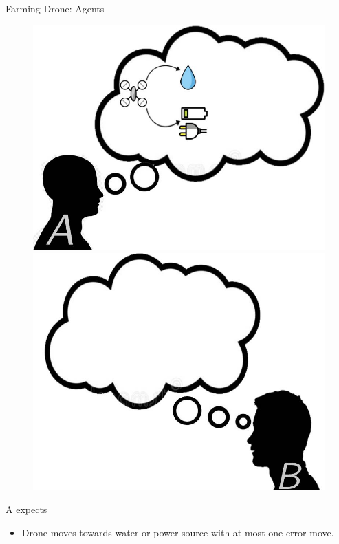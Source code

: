 \documentclass{beamer}
\begin{document}
\begin{frame}{Farming Drone: Agents}
    \begin{figure}
        \centering
        \includegraphics[scale=0.2]{images/a-expects-move.jpg}
        \includegraphics[scale=0.2]{images/b-expects.jpg}
    \end{figure}
    A expects
    \begin{itemize}
        \item Drone moves towards water or power source with at most one error move.
    \end{itemize}
\end{frame}
\end{document}
